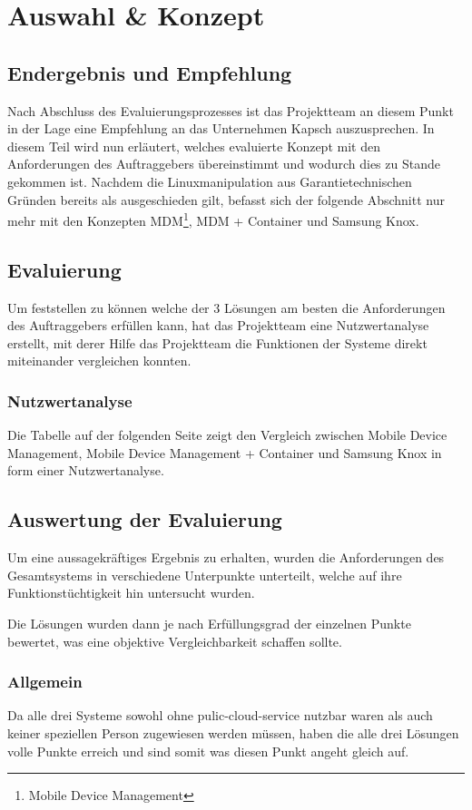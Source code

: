 \chapter{Auswahl \& Konzept}
\section{Endergebnis und Empfehlung}
Nach Abschluss des Evaluierungsprozesses ist das Projektteam an diesem Punkt in der Lage eine Empfehlung an das Unternehmen Kapsch auszusprechen. In diesem Teil wird nun erläutert, welches evaluierte Konzept mit den Anforderungen des Auftraggebers übereinstimmt und wodurch dies zu Stande gekommen ist. Nachdem die Linuxmanipulation aus Garantietechnischen Gründen bereits als ausgeschieden gilt, befasst sich der folgende Abschnitt nur mehr mit den Konzepten MDM\footnote{Mobile Device Management}, MDM + Container und Samsung Knox.
\section{Evaluierung}
Um feststellen zu können welche der 3 Lösungen am besten die Anforderungen des Auftraggebers erfüllen kann, hat das Projektteam eine Nutzwertanalyse erstellt, mit derer Hilfe das Projektteam die Funktionen der Systeme direkt miteinander vergleichen konnten.
\subsection{Nutzwertanalyse}
Die Tabelle auf der folgenden Seite zeigt den Vergleich zwischen Mobile Device Management, Mobile Device Management + Container und Samsung Knox in form einer Nutzwertanalyse.



\section{Auswertung der Evaluierung}
Um eine aussagekräftiges Ergebnis zu erhalten, wurden die Anforderungen des Gesamtsystems in verschiedene Unterpunkte unterteilt, welche auf ihre Funktionstüchtigkeit hin untersucht wurden. \par
Die Lösungen wurden dann je nach Erfüllungsgrad der einzelnen Punkte bewertet, was eine objektive Vergleichbarkeit schaffen sollte.
\subsection{Allgemein}
Da alle drei Systeme sowohl ohne pulic-cloud-service nutzbar waren als auch keiner speziellen Person zugewiesen werden müssen, haben die alle drei Lösungen volle Punkte erreich und sind somit was diesen Punkt angeht gleich auf.
